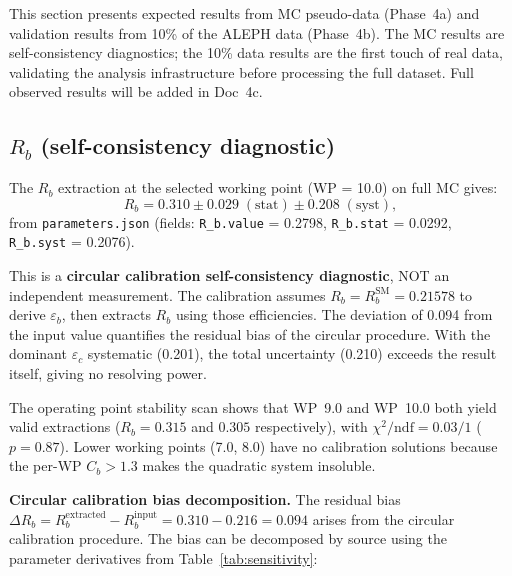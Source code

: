 \documentclass[11pt,a4paper]{article}
\begin{document}
This section presents expected results from MC pseudo-data (Phase~4a) and
validation results from 10\% of the ALEPH data (Phase~4b). The MC results are
self-consistency diagnostics; the 10\% data results are the first touch of real
data, validating the analysis infrastructure before processing the full dataset.
Full observed results will be added in Doc~4c.

\subsection{$R_b$ (self-consistency diagnostic)}
\label{sec:result_rb}

The $R_b$ extraction at the selected working point (WP = 10.0) on full MC gives:
\begin{equation}
R_b = 0.310 \pm 0.029\;\mathrm{(stat)} \pm 0.208\;\mathrm{(syst)},
\label{eq:rb_result}
\end{equation}
from \texttt{parameters.json} (fields: \texttt{R\_b.value} = 0.2798,
\texttt{R\_b.stat} = 0.0292, \texttt{R\_b.syst} = 0.2076).

This is a \textbf{circular calibration self-consistency diagnostic}, NOT an independent
measurement. The calibration assumes $R_b = R_b^\mathrm{SM} = 0.21578$ to derive
$\varepsilon_b$, then extracts $R_b$ using those efficiencies. The deviation of 0.094
from the input value quantifies the residual bias of the circular procedure. With the
dominant $\varepsilon_c$ systematic (0.201), the total uncertainty (0.210)
exceeds the result itself, giving no resolving power.

The operating point stability scan shows that WP~9.0 and WP~10.0 both yield valid
extractions ($R_b = 0.315$ and $0.305$ respectively), with $\chi^2/\mathrm{ndf} = 0.03/1$
($p = 0.87$). Lower working points (7.0, 8.0) have no calibration solutions because
the per-WP $C_b > 1.3$ makes the quadratic system insoluble.

\textbf{Circular calibration bias decomposition.}
The residual bias $\Delta R_b = R_b^\mathrm{extracted} - R_b^\mathrm{input} =
0.310 - 0.216 = 0.094$ arises from the circular calibration procedure. The bias
can be decomposed by source using the parameter derivatives from
Table~\ref{tab:sensitivity}:
\end{document}
